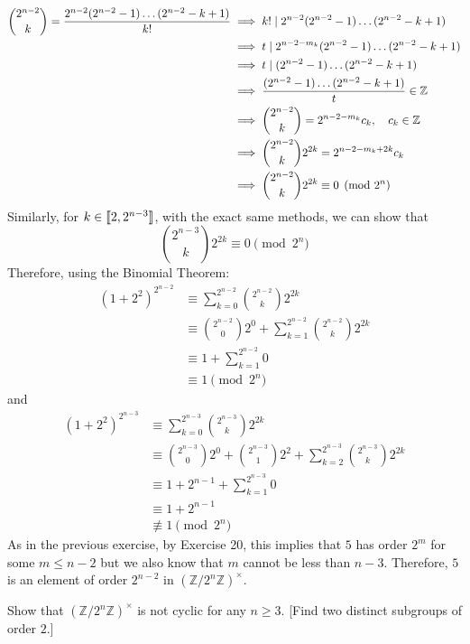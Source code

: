 \begin{solution}
    \begin{align*}
        \binom{2^{n-2}}{k} = \frac{2^{n-2}(2^{n-2} - 1)\dots (2^{n-2} - k + 1)}{k!} &\implies k! \mathrel{|} 2^{n-2}(2^{n-2} - 1)\dots (2^{n-2} - k + 1) \\
        &\implies t \mathrel{|} 2^{n-2-m_k}(2^{n-2} - 1)\dots (2^{n-2} - k + 1) \\
        &\implies t \mathrel{|} (2^{n-2} - 1)\dots (2^{n-2} - k + 1) \\
        &\implies \frac{(2^{n-2} - 1)\dots (2^{n-2} - k + 1)}{t} \in \mathbb{Z}\\
        &\implies \binom{2^{n-2}}{k} = 2^{n-2-m_k}c_k, \quad c_k \in \mathbb{Z} \\
        &\implies \binom{2^{n-2}}{k}2^{2k} = 2^{n-2-m_k + 2k}c_k \\
        &\implies \binom{2^{n-2}}{k}2^{2k} \equiv 0 \pmod{2^n}
    \end{align*}
    Similarly, for $k \in \llbracket 2 , 2^{n-3} \rrbracket$, with the exact same methods, we can show that
    $$\binom{2^{n-3}}{k}2^{2k} \equiv 0 \pmod{2^n}$$
    Therefore, using the Binomial Theorem:
    \begin{align*}
        (1+2^2)^{2^{n-2}} &\equiv \sum_{k=0}^{2^{n-2}}\binom{2^{n-2}}{k}2^{2k} \\
        &\equiv \binom{2^{n-2}}{0}2^0 + \sum_{k=1}^{2^{n-2}}\binom{2^{n-2}}{k}2^{2k} \\
        &\equiv 1 + \sum_{k=1}^{2^{n-2}}0 \\
        &\equiv 1 \pmod{2^n}
    \end{align*}
    and
    \begin{align*}
        (1+2^2)^{2^{n-3}} &\equiv \sum_{k=0}^{2^{n-3}}\binom{2^{n-3}}{k}2^{2k} \\
        &\equiv \binom{2^{n-3}}{0}2^0 + \binom{2^{n-3}}{1}2^2 + \sum_{k=2}^{2^{n-3}}\binom{2^{n-3}}{k}2^{2k} \\
        &\equiv 1 + 2^{n-1} + \sum_{k=1}^{2^{n-3}}0 \\
        &\equiv 1 + 2^{n-1} \\
        &\not\equiv 1 \pmod{2^n}
    \end{align*}
    As in the previous exercise, by Exercise 20, this implies that $5$ has order $2^m$ for some $m \leq n-2$ but we also know that $m$ cannot be less than $n-3$. Therefore, $5$ is an element of order $2^{n-2}$ in $(\mathbb{Z}/2^n\mathbb{Z})^{\times}$. \\
\end{solution} 

\begin{exercise}
    Show that $(\mathbb{Z}/2^n\mathbb{Z})^{\times}$ is not cyclic for any $n \geq 3$. [Find two distinct subgroups of order $2$.]\\ 
\end{exercise}

